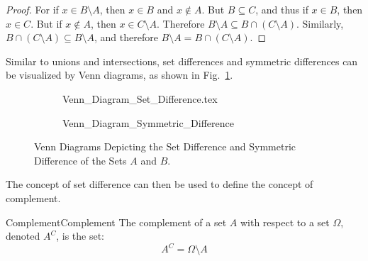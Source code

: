 \documentclass[crop=false,class=book,oneside]{standalone}
\begin{document}
            \begin{proof}
                For if $x\in{B}\setminus{A}$, then
                $x\in{B}$ and $x\notin{A}$. But
                $B\subseteq{C}$, and thus if $x\in{B}$, then
                $x\in{C}$. But if $x\notin{A}$, then
                $x\in{C}\setminus{A}$. Therefore
                $B\setminus{A}\subseteq{B}\cap(C\setminus{A})$.
                Similarly,
                $B\cap(C\setminus{A})\subseteq{B}\setminus{A}$,
                and therefore
                $B\setminus{A}={B}\cap(C\setminus{A})$.
            \end{proof}
            Similar to unions and intersections,
            set differences and symmetric differences can be
            visualized by Venn diagrams, as shown in
            Fig.~\ref{fig:Difference_Sym_Venn_Diagram}.
            \begin{figure}[H]
                \centering
                \captionsetup{type=figure}
                \begin{subfigure}[b]{0.49\textwidth}
                    \centering
                    
                        {Venn_Diagram_Set_Difference.tex}
                \end{subfigure}
                \begin{subfigure}[b]{0.49\textwidth}
                    \centering
                    
                        {Venn_Diagram_Symmetric_Difference}
                \end{subfigure}
                \caption[Venn Diagrams for Set Difference
                         and Symmetric Difference]
                        {Venn Diagrams Depicting the Set
                         Difference and Symmetric Difference
                         of the Sets $A$ and $B$.}
                \label{fig:Difference_Sym_Venn_Diagram}
            \end{figure}
            The concept of set difference can then be used to
            define the concept of complement.
            \begin{ldefinition}{Complement}{Complement}
                The complement of a set $A$ with respect to a set
                $\Omega$, denoted $A^{C}$, is the set:
                \begin{equation}
                    A^{C}=\Omega\setminus{A}
                \end{equation}
            \end{ldefinition}
\end{document}
